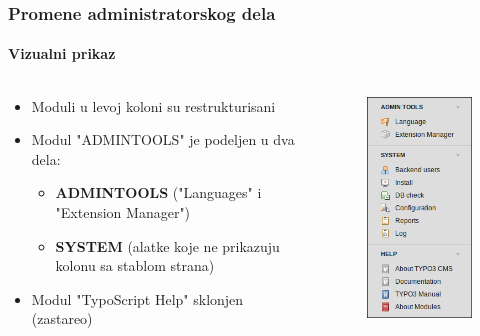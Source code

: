 
\begin{frame}[fragile]
	\frametitle{Promene administratorskog dela}
	\framesubtitle{Vizualni prikaz}

	\begin{columns}[T]

		\begin{column}{.5\textwidth}

			\begin{itemize}
				\item Moduli u levoj koloni su restrukturisani
				\item Modul "ADMINTOOLS" je podeljen u dva dela:

					\begin{itemize}
						\item \textbf{ADMINTOOLS} ("Languages" i "Extension Manager")
						\item \textbf{SYSTEM} (alatke koje ne prikazuju kolonu sa stablom strana)
					\end{itemize}

				\item Modul "TypoScript Help" sklonjen (zastareo)

			\end{itemize}

		\end{column}

		\begin{column}{.5\textwidth}
			\begin{figure}\vspace*{-0.4cm}
				\includegraphics[width=0.35\linewidth]{Images/BackendChanges/AdminTools.png}
			\end{figure}
		\end{column}

	\end{columns}

\end{frame}

